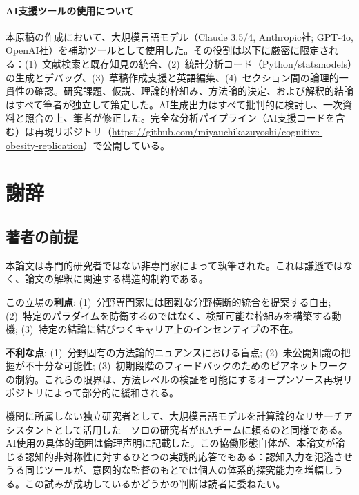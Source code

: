 \documentclass[a4paper,11pt,titlepage]{article}
\begin{document}
\paragraph{AI支援ツールの使用について}
本原稿の作成において、大規模言語モデル（Claude 3.5/4, Anthropic社; GPT-4o, OpenAI社）を補助ツールとして使用した。その役割は以下に厳密に限定される：(1)~文献検索と既存知見の統合、(2)~統計分析コード（Python/statsmodels）の生成とデバッグ、(3)~草稿作成支援と英語編集、(4)~セクション間の論理的一貫性の確認。研究課題、仮説、理論的枠組み、方法論的決定、および解釈的結論はすべて筆者が独立して策定した。AI生成出力はすべて批判的に検討し、一次資料と照合の上、筆者が修正した。完全な分析パイプライン（AI支援コードを含む）は再現リポジトリ（\url{https://github.com/miyauchikazuyoshi/cognitive-obesity-replication}）で公開している。

\section*{謝辞}

\subsection*{著者の前提}

本論文は専門的研究者ではない非専門家によって執筆された。これは謙遜ではなく、論文の解釈に関連する構造的制約である。

この立場の\textbf{利点}: (1)~分野専門家には困難な分野横断的統合を提案する自由; (2)~特定のパラダイムを防衛するのではなく、検証可能な枠組みを構築する動機; (3)~特定の結論に結びつくキャリア上のインセンティブの不在。

\textbf{不利な点}: (1)~分野固有の方法論的ニュアンスにおける盲点; (2)~未公開知識の把握が不十分な可能性; (3)~初期段階のフィードバックのためのピアネットワークの制約。これらの限界は、方法レベルの検証を可能にするオープンソース再現リポジトリによって部分的に緩和される。

機関に所属しない独立研究者として、大規模言語モデルを計算論的なリサーチアシスタントとして活用した---ソロの研究者がRAチームに頼るのと同様である。AI使用の具体的範囲は倫理声明に記載した。この協働形態自体が、本論文が論じる認知的非対称性に対するひとつの実践的応答でもある：認知入力を氾濫させうる同じツールが、意図的な監督のもとでは個人の体系的探究能力を増幅しうる。この試みが成功しているかどうかの判断は読者に委ねたい。
\end{document}
